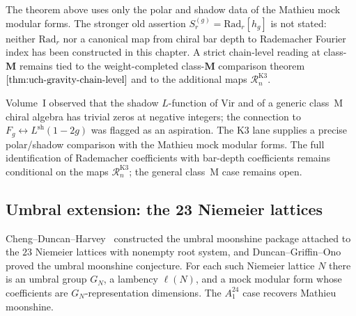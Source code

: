 \begin{remark}
\label{rem:shadow-tower-moonshine-uch-scope}
The theorem above uses only the polar and shadow data of the Mathieu
mock modular forms. The stronger old assertion
\(S_r^{(g)}=\mathrm{Rad}_r[h_g]\) is not stated: neither
\(\mathrm{Rad}_r\) nor a canonical map from chiral bar depth to
Rademacher Fourier index has been constructed in this chapter. A strict
chain-level reading at class-\(\mathbf M\) remains tied to the
weight-completed class-\(\mathbf M\) comparison theorem
\(\ref{thm:uch-gravity-chain-level}\) and to the additional maps
\(\mathcal R_n^{\mathrm{K3}}\).
\end{remark}

\begin{remark}
\label{rem:cmb-shadow-L-function-closure}
Volume~I observed that the shadow $L$-function of Vir and of a
generic class~M chiral algebra has trivial zeros at negative integers;
the connection to \(F_g\leftrightarrow L^{\mathrm{sh}}(1-2g)\) was
flagged as an aspiration. The K3 lane supplies a precise polar/shadow
comparison with the Mathieu mock modular forms. The full identification
of Rademacher coefficients with bar-depth coefficients remains
conditional on the maps \(\mathcal R_n^{\mathrm{K3}}\); the general
class~M case remains open.
\end{remark}

\subsection{Umbral extension: the 23 Niemeier lattices}
\label{subsec:cmb-umbral}

Cheng--Duncan--Harvey~\cite{ChengDuncanHarvey1,ChengDuncanHarvey2}
constructed the umbral moonshine package attached to the $23$ Niemeier
lattices with nonempty root system, and Duncan--Griffin--Ono
\cite{DuncanGriffinOno15} proved the umbral moonshine conjecture. For
each such Niemeier lattice $N$ there is an umbral group $G_N$, a
lambency \(\ell(N)\), and a mock modular form whose coefficients are
$G_N$-representation dimensions. The \(A_1^{24}\) case recovers Mathieu
moonshine.

